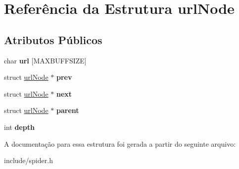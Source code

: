 \hypertarget{structurl_node}{}\section{Referência da Estrutura url\+Node}
\label{structurl_node}
\subsection*{Atributos Públicos}
\begin{DoxyCompactItemize}
\item 
\mbox{\label{structurl_node_a116484f8d9302e5553f13d9cf3bdd783}} 
char {\bfseries url} \mbox{[}M\+A\+X\+B\+U\+F\+F\+S\+I\+ZE\mbox{]}
\item 
\mbox{\label{structurl_node_aaff2d0dbe73ac717785c34c780f7ce2f}} 
struct \mbox{\hyperlink{structurl_node}{url\+Node}} $\ast$ {\bfseries prev}
\item 
\mbox{\label{structurl_node_a8fbb5ac0de241023bd3cbe3173242e08}} 
struct \mbox{\hyperlink{structurl_node}{url\+Node}} $\ast$ {\bfseries next}
\item 
\mbox{\label{structurl_node_a8f2c5b9852257bb5caa6fb817b458447}} 
struct \mbox{\hyperlink{structurl_node}{url\+Node}} $\ast$ {\bfseries parent}
\item 
\mbox{\label{structurl_node_af345d8d7cb415702ae9fb1837bb15108}} 
int {\bfseries depth}
\end{DoxyCompactItemize}


A documentação para essa estrutura foi gerada a partir do seguinte arquivo\+:\begin{DoxyCompactItemize}
\item 
include/spider.\+h\end{DoxyCompactItemize}
